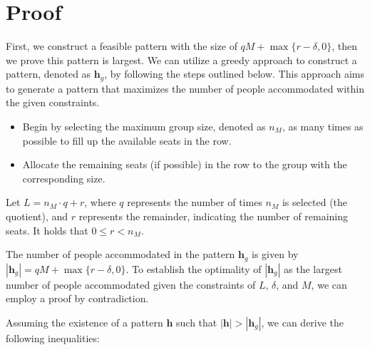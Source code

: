 \clearpage
\section*{Proof}

\begin{pf}
First, we construct a feasible pattern with the size of $qM + \max\{r-\delta, 0\}$, then we prove this pattern is largest. We can utilize a greedy approach to construct a pattern, denoted as $\bm{h}_{g}$, by following the steps outlined below. This approach aims to generate a pattern that maximizes the number of people accommodated within the given constraints.

\begin{itemize}
 \item Begin by selecting the maximum group size, denoted as $n_M$, as many times as possible to fill up the available seats in the row.
 \item Allocate the remaining seats (if possible) in the row to the group with the corresponding size.
\end{itemize}

Let $L = n_M \cdot q + r$, where $q$ represents the number of times $n_M$ is selected (the quotient), and $r$ represents the remainder, indicating the number of remaining seats. It holds that $0 \leq r < n_M$. 

The number of people accommodated in the pattern $\bm{h}_{g}$ is given by $|\bm{h}_{g}| = q M + \max\{r-\delta, 0\}$. To establish the optimality of $|\bm{h}_{g}|$ as the largest number of people accommodated given the constraints of $L$, $\delta$, and $M$, we can employ a proof by contradiction.



Assuming the existence of a pattern $\bm{h}$ such that $|\bm{h}| > |\bm{h}_{g}|$, we can derive the following inequalities:


\end{pf}
